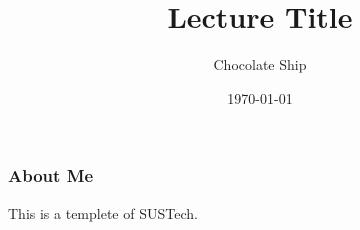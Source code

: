 \documentclass{beamer}
\title{Lecture Title}
\author{Chocolate Ship}
\date{\today}
\begin{document}
\begin{frame}
    \titlepage
\end{frame}

\begin{frame}
    \frametitle{About Me}
    This is a templete of SUSTech.
\end{frame}
\end{document}
